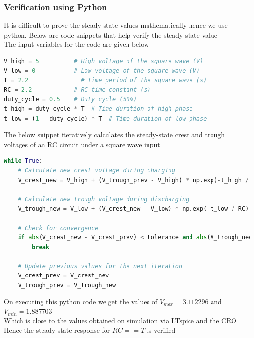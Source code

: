 \documentclass[journal]{IEEEtran}
\begin{document}
\subsubsection{Verification using Python}
It is difficult to prove the steady state values mathematically hence we use python. Below are code snippets that help verify the steady state value \\
The input variables for the code are given below
\begin{lstlisting}[language=python]
V_high = 5          # High voltage of the square wave (V)
V_low = 0           # Low voltage of the square wave (V)
T = 2.2               # Time period of the square wave (s)
RC = 2.2            # RC time constant (s)
duty_cycle = 0.5    # Duty cycle (50%)
t_high = duty_cycle * T  # Time duration of high phase
t_low = (1 - duty_cycle) * T  # Time duration of low phase
\end{lstlisting}
The below snippet iteratively calculates the steady-state crest and trough voltages of an RC circuit under a square wave input
\begin{lstlisting}[language=python]
while True:
    # Calculate new crest voltage during charging
    V_crest_new = V_high + (V_trough_prev - V_high) * np.exp(-t_high / RC)
    
    # Calculate new trough voltage during discharging
    V_trough_new = V_low + (V_crest_new - V_low) * np.exp(-t_low / RC)
    
    # Check for convergence
    if abs(V_crest_new - V_crest_prev) < tolerance and abs(V_trough_new - V_trough_prev) < tolerance:
        break
    
    # Update previous values for the next iteration
    V_crest_prev = V_crest_new
    V_trough_prev = V_trough_new
\end{lstlisting}
On executing this python code we get the values of $V_{max} = 3.112296$ and $V_{min} = 1.887703$ \\
Which is close to the values obtained on simulation via LTspice and the CRO \\
Hence the steady state response for $RC==T$ is verified 
\end{document}
